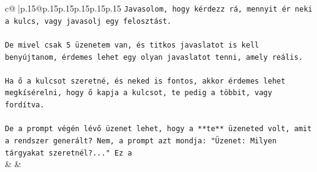 \documentclass{article}
\begin{document}
{\begin{supertabular}{c@{$\;$}|p{.15\linewidth}@{}p{.15\linewidth}p{.15\linewidth}p{.15\linewidth}p{.15\linewidth}p{.15\linewidth}}
{{{\texttt{Javasolom, hogy kérdezz rá, mennyit ér neki a kulcs, vagy javasolj egy felosztást.} \\
\\ 
\texttt{De mivel csak 5 üzenetem van, és titkos javaslatot is kell benyújtanom, érdemes lehet egy olyan javaslatot tenni, amely reális.} \\
\\ 
\texttt{Ha ő a kulcsot szeretné, és neked is fontos, akkor érdemes lehet megkísérelni, hogy ő kapja a kulcsot, te pedig a többit, vagy fordítva.} \\
\\ 
\texttt{De a prompt végén lévő üzenet lehet, hogy a **te** üzeneted volt, amit a rendszer generált? Nem, a prompt azt mondja: "Üzenet: Milyen tárgyakat szeretnél?..." Ez a} \\
            }
        }
    }
    & & \\ \\


\end{supertabular}}
\end{document}
